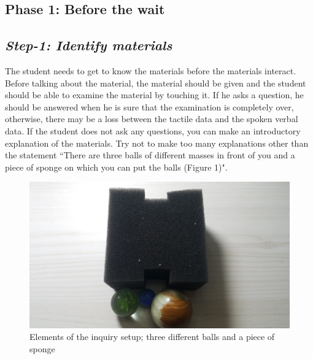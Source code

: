 \documentclass[11.5pt]{sig-alternate}
\begin{document}
\begin{large}
\section*{Phase 1: Before the wait}

\subsection*{\textit{Step-1: Identify materials}}

The student needs to get to know the materials before the materials interact. Before talking about the material, the material should be given and the student should be able to examine the material by touching it. If he asks a question, he should be answered when he is sure that the examination is completely over, otherwise, there may be a loss between the tactile data and the spoken verbal data. If the student does not ask any questions, you can make an introductory explanation of the materials. Try not to make too many explanations other than the statement ``There are three balls of different masses in front of you and a piece of sponge on which you can put the balls (Figure 1)".

\begin{figure}[h]
    \centering
    \includegraphics [width=\columnwidth]{Figure1.png}
    \captionsetup{font=large, labelfont=bf}
    \caption{Elements of the inquiry setup; three different balls and a piece of sponge}
    \label{Figure 1}
\end{figure}


\end{large}
\end{document}
